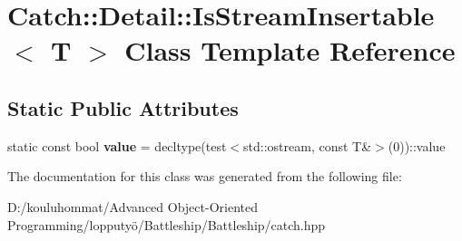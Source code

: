 \hypertarget{class_catch_1_1_detail_1_1_is_stream_insertable}{}\section{Catch\+:\+:Detail\+:\+:Is\+Stream\+Insertable$<$ T $>$ Class Template Reference}
\label{class_catch_1_1_detail_1_1_is_stream_insertable}
\subsection*{Static Public Attributes}
\begin{DoxyCompactItemize}
\item 
\mbox{\label{class_catch_1_1_detail_1_1_is_stream_insertable_a42818b09ae5851126a70ee263769e309}} 
static const bool {\bfseries value} = decltype(test$<$std\+::ostream, const T\&$>$(0))\+::value
\end{DoxyCompactItemize}


The documentation for this class was generated from the following file\+:\begin{DoxyCompactItemize}
\item 
D\+:/kouluhommat/\+Advanced Object-\/\+Oriented Programming/lopputyö/\+Battleship/\+Battleship/catch.\+hpp\end{DoxyCompactItemize}
